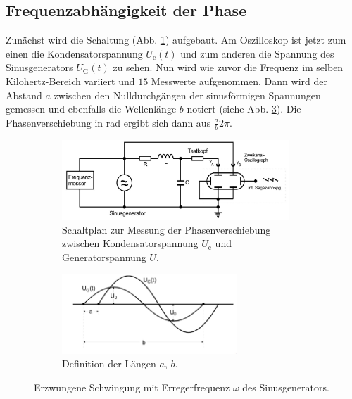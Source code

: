 \subsection{Frequenzabhängigkeit der Phase}
Zunächst wird die Schaltung (Abb. \ref{fig:phase}) aufgebaut.
Am Oszilloskop ist jetzt zum einen die Kondensatorspannung $U_\text{c}(t)$ und zum anderen die Spannung des Sinusgenerators $U_\text{G}(t)$ zu sehen.
Nun wird wie zuvor die Frequenz im selben Kilohertz-Bereich variiert und $15$ Messwerte aufgenommen.
Dann wird der Abstand $a$ zwischen den Nulldurchgängen der sinusförmigen Spannungen gemessen und ebenfalls die Wellenlänge $b$ notiert (siehe Abb. \ref{fig:phase_ab}).
Die Phasenverschiebung in rad ergibt sich dann aus $\frac{a}{b}2\pi$.
\begin{figure}
    \centering
    \begin{subfigure}{0.48\textwidth}
        \centering
        \includegraphics[height=3cm]{content/data/phase.jpg}
        \caption{Schaltplan zur Messung der Phasenverschiebung zwischen Kondensatorspannung $U_\text{c}$ und Generatorspannung $U$. \cite[S.296]{anleitung}}
        \label{fig:phase}
    \end{subfigure}
    \begin{subfigure}{0.48\textwidth}
        \centering
        \includegraphics[height=3cm]{content/data/phase_ab.jpg}
        \caption{Definition der Längen $a$, $b$. \cite[S.282]{anleitung_rc}} 
        \label{fig:phase_ab}
    \end{subfigure}
    \caption{Erzwungene Schwingung mit Erregerfrequenz $\omega$ des Sinusgenerators.}
\end{figure}
